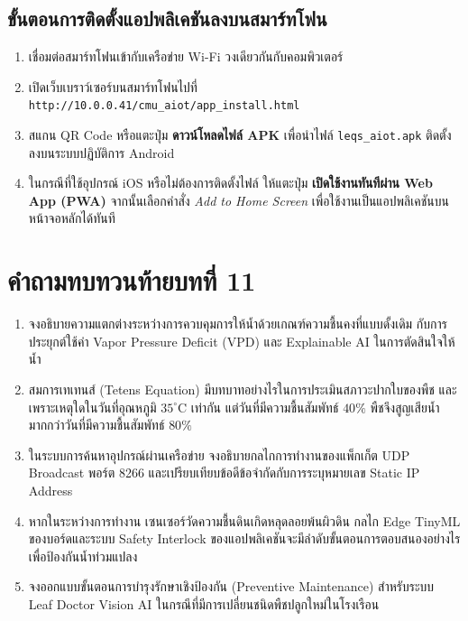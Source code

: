 \subsection{ขั้นตอนการติดตั้งแอปพลิเคชันลงบนสมาร์ทโฟน}
\begin{enumerate}
    \item เชื่อมต่อสมาร์ทโฟนเข้ากับเครือข่าย Wi-Fi วงเดียวกันกับคอมพิวเตอร์
    \item เปิดเว็บเบราว์เซอร์บนสมาร์ทโฟนไปที่ \texttt{http://10.0.0.41/cmu\_aiot/app\_install.html}
    \item สแกน QR Code หรือแตะปุ่ม \textbf{ดาวน์โหลดไฟล์ APK} เพื่อนำไฟล์ \texttt{leqs\_aiot.apk} ติดตั้งลงบนระบบปฏิบัติการ Android
    \item ในกรณีที่ใช้อุปกรณ์ iOS หรือไม่ต้องการติดตั้งไฟล์ ให้แตะปุ่ม \textbf{เปิดใช้งานทันทีผ่าน Web App (PWA)} จากนั้นเลือกคำสั่ง \textit{Add to Home Screen} เพื่อใช้งานเป็นแอปพลิเคชันบนหน้าจอหลักได้ทันที
\end{enumerate}

\section*{คำถามทบทวนท้ายบทที่ 11}

\begin{enumerate}[topsep=4pt, itemsep=4pt, partopsep=0pt, parsep=0pt, leftmargin=1.8em]
    \item จงอธิบายความแตกต่างระหว่างการควบคุมการให้น้ำด้วยเกณฑ์ความชื้นคงที่แบบดั้งเดิม กับการประยุกต์ใช้ค่า Vapor Pressure Deficit (VPD) และ Explainable AI ในการตัดสินใจให้น้ำ
    \item สมการเทเทนส์ (Tetens Equation) มีบทบาทอย่างไรในการประเมินสภาวะปากใบของพืช และเพราะเหตุใดในวันที่อุณหภูมิ $35^\circ\text{C}$ เท่ากัน แต่วันที่มีความชื้นสัมพัทธ์ $40\%$ พืชจึงสูญเสียน้ำมากกว่าวันที่มีความชื้นสัมพัทธ์ $80\%$
    \item ในระบบการค้นหาอุปกรณ์ผ่านเครือข่าย จงอธิบายกลไกการทำงานของแพ็กเก็ต UDP Broadcast พอร์ต 8266 และเปรียบเทียบข้อดีข้อจำกัดกับการระบุหมายเลข Static IP Address
    \item หากในระหว่างการทำงาน เซนเซอร์วัดความชื้นดินเกิดหลุดลอยพ้นผิวดิน กลไก Edge TinyML ของบอร์ดและระบบ Safety Interlock ของแอปพลิเคชันจะมีลำดับขั้นตอนการตอบสนองอย่างไรเพื่อป้องกันน้ำท่วมแปลง
    \item จงออกแบบขั้นตอนการบำรุงรักษาเชิงป้องกัน (Preventive Maintenance) สำหรับระบบ Leaf Doctor Vision AI ในกรณีที่มีการเปลี่ยนชนิดพืชปลูกใหม่ในโรงเรือน
\end{enumerate}

\clearpage
